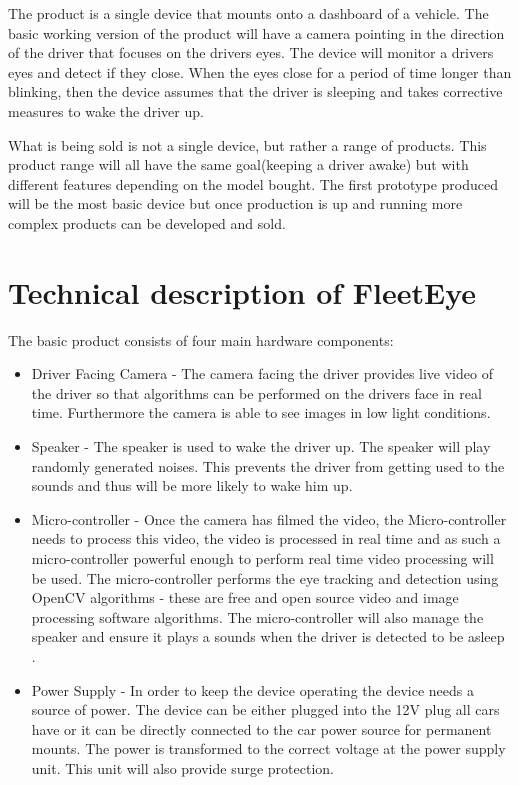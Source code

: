 The product is a single device that mounts onto a dashboard of a vehicle. The basic working version of the product will have a camera pointing in the direction of the driver that focuses on the drivers eyes. The device will monitor a drivers eyes and detect if they close. When the eyes close for a period of time longer than blinking, then the device assumes that the driver is sleeping and takes corrective measures to wake the driver up.

What is being sold is not a single device, but rather a range of products. This product range will all have the same goal(keeping a driver awake) but with different features depending on the model bought. The first prototype produced will be the most basic device but once production is up and running more complex products can be developed and sold.

\section{Technical description of FleetEye}

The basic product consists of four main hardware components:
\begin{itemize}
  \item Driver Facing Camera - The camera facing the driver provides live video of the driver so that algorithms can be performed on the drivers face in real time. Furthermore the camera is able to see images in low light conditions.
  \item Speaker - The speaker is used to wake the driver up. The speaker will play randomly generated noises. This prevents the driver from getting used to the sounds and thus will be more likely to wake him up\cite{Habituation}.
  \item Micro-controller - Once the camera has filmed the video, the Micro-controller needs to process this video, the video is processed in real time and as such a micro-controller powerful enough to perform real time video processing will be used. The micro-controller performs the eye tracking and detection using OpenCV algorithms - these are free and open source video and image processing software algorithms. The micro-controller will also manage the speaker and ensure it plays a sounds when the driver is detected to be asleep \cite{OpenCV}.
  \item Power Supply - In order to keep the device operating the device needs a source of power. The device can be either plugged into the 12V plug all cars have or it can be directly connected to the car power source for permanent mounts. The power is transformed to the correct voltage at the power supply unit. This unit will also provide surge protection.
\end{itemize}

